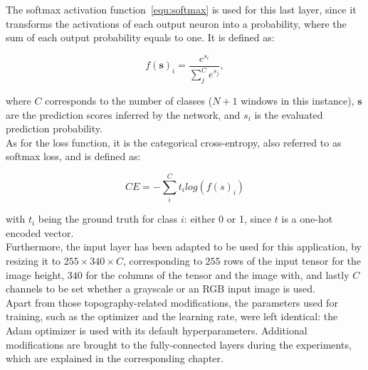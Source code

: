 The softmax activation function~\ref{equ:softmax} is used for this last layer,
since it transforms the activations of each output neuron into a probability,
where the sum of each output probability equals to one. It is defined as:

\begin{equation}
	\label{equ:softmax}
	f(\mathbf{s})_i=\frac{e^{s_i}}{\sum_j^C e^{s_j}},
\end{equation}

where $C$ corresponds to the number of classes ($N+1$ windows in this
instance), $\mathbf{s}$ are the prediction scores inferred by the network, and
$s_i$ is the evaluated prediction probability.\\

As for the loss function, it is the categorical cross-entropy, also referred to
as softmax loss, and is defined as:

\begin{equation}
	\label{equ:catcrossentr}
	CE=\displaystyle-\sum_i^C t_i log(f(s)_i)
\end{equation}

with $t_i$ being the ground truth for class $i$: either 0 or 1, since $t$ is a
one-hot encoded vector.\\


Furthermore, the input layer has been adapted to be used for this application,
by resizing it to $255\times340\times C$, corresponding to $255$ rows of the
input tensor for the image height, $340$ for the columns of the tensor and the
image with, and lastly $C$ channels to be set whether a grayscale or an RGB
input image is used.\\

Apart from those topography-related modifications, the parameters used for
training, such as the optimizer and the learning rate, were left identical: the
Adam optimizer is used with its default hyperparameters. Additional
modifications are brought to the fully-connected layers during the experiments,
which are explained in the corresponding chapter.

